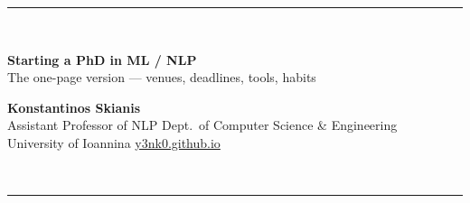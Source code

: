\documentclass[10pt,a4paper]{article}
\newcommand{\lnk}[2]{\href{#1}{\color{brandlight}#2}}
\newcommand{\dt}{\,\textperiodcentered\,\allowbreak}
\begin{document}
\fontsize{6.35}{7.45}\selectfont

{\color{brandlight}\rule{\textwidth}{2pt}}\\[2pt]
\begin{minipage}[b]{0.63\textwidth}
{\fontsize{17}{18}\selectfont\bfseries\color{brand} Starting a PhD in ML / NLP}\\[2pt]
{\fontsize{8}{9}\selectfont\color{ink} The one-page version --- venues, deadlines, tools, habits}
\end{minipage}%
\hfill
\begin{minipage}[b]{0.36\textwidth}\raggedleft
{\fontsize{8}{9}\selectfont\bfseries\color{ink} Konstantinos Skianis}\\[1pt]
{\color{mutegray} Assistant Professor of NLP\dt Dept.\ of Computer Science \& Engineering\\
University of Ioannina\dt \lnk{https://y3nk0.github.io}{y3nk0.github.io}}
\end{minipage}\\[2pt]
{\color{brandlight}\rule{\textwidth}{2pt}}
\end{document}
